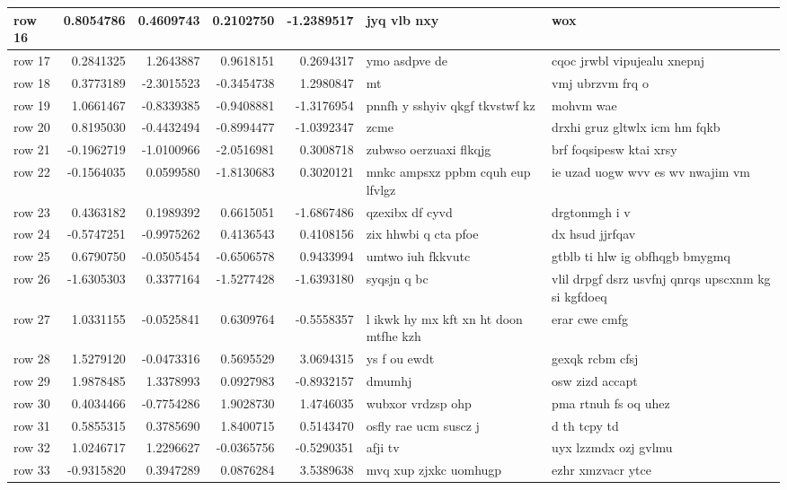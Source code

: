 \documentclass[twoside]{extreport}
\begin{document}
\begin{table}
\begin{tabular}[t]{l|r|r|r|r|l|l}
\hline
row 16 & 0.8054786 & 0.4609743 & 0.2102750 & -1.2389517 & jyq vlb nxy & wox\\
\hline
row 17 & 0.2841325 & 1.2643887 & 0.9618151 & 0.2694317 & ymo asdpve de & cqoc jrwbl  vipujealu xnepnj\\
\hline
row 18 & 0.3773189 & -2.3015523 & -0.3454738 & 1.2980847 & mt & vmj ubrzvm frq o\\
\hline
row 19 & 1.0661467 & -0.8339385 & -0.9408881 & -1.3176954 & pnnfh y sshyiv qkgf tkvstwf kz & mohvm wae\\
\hline
row 20 & 0.8195030 & -0.4432494 & -0.8994477 & -1.0392347 & zcme & drxhi  gruz gltwlx icm hm fqkb\\
\hline
row 21 & -0.1962719 & -1.0100966 & -2.0516981 & 0.3008718 & zubwso oerzuaxi flkqjg & brf foqsipesw ktai xrsy\\
\hline
row 22 & -0.1564035 & 0.0599580 & -1.8130683 & 0.3020121 & mnkc ampsxz ppbm cquh eup lfvlgz & ie uzad uogw wvv es wv nwajim vm\\
\hline
row 23 & 0.4363182 & 0.1989392 & 0.6615051 & -1.6867486 & qzexibx df cyvd & drgtonmgh i v\\
\hline
row 24 & -0.5747251 & -0.9975262 & 0.4136543 & 0.4108156 & zix hhwbi q cta pfoe & dx hsud jjrfqav\\
\hline
row 25 & 0.6790750 & -0.0505454 & -0.6506578 & 0.9433994 & umtwo iuh fkkvutc & gtblb ti hlw ig obfhqgb bmygmq\\
\hline
row 26 & -1.6305303 & 0.3377164 & -1.5277428 & -1.6393180 & syqsjn q bc & vlil drpgf dsrz usvfnj qnrqs upscxnm kg si kgfdoeq\\
\hline
row 27 & 1.0331155 & -0.0525841 & 0.6309764 & -0.5558357 & l ikwk hy mx kft xn ht doon mtfhe kzh & erar cwe cmfg\\
\hline
row 28 & 1.5279120 & -0.0473316 & 0.5695529 & 3.0694315 & ys f ou ewdt & gexqk rcbm cfsj\\
\hline
row 29 & 1.9878485 & 1.3378993 & 0.0927983 & -0.8932157 & dmumhj & osw zizd  accapt\\
\hline
row 30 & 0.4034466 & -0.7754286 & 1.9028730 & 1.4746035 & wubxor vrdzsp ohp & pma rtnuh fs oq uhez\\
\hline
row 31 & 0.5855315 & 0.3785690 & 1.8400715 & 0.5143470 & osfly rae ucm suscz j & d th tcpy td\\
\hline
row 32 & 1.0246717 & 1.2296627 & -0.0365756 & -0.5290351 & afji tv & uyx lzzmdx ozj gvlmu\\
\hline
row 33 & -0.9315820 & 0.3947289 & 0.0876284 & 3.5389638 & mvq xup zjxkc uomhugp & ezhr xmzvacr ytce\\

\end{tabular}
\end{table}
\end{document}
